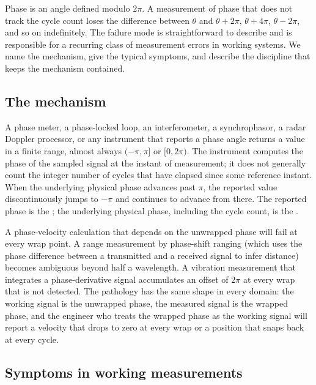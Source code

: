 Phase is an angle defined modulo $2\pi$. A measurement of phase
that does not track the cycle count loses the difference between
$\theta$ and $\theta + 2\pi$, $\theta + 4\pi$, $\theta - 2\pi$,
and so on indefinitely. The failure mode is straightforward to
describe and is responsible for a recurring class of measurement
errors in working systems. We name the mechanism, give the
typical symptoms, and describe the discipline that keeps the
mechanism contained.

\subsection{The mechanism}

A phase meter, a phase-locked loop, an interferometer, a
synchrophasor, a radar Doppler processor, or any instrument that
reports a phase angle returns a value in a finite range, almost
always $(-\pi, \pi]$ or $[0, 2\pi)$. The instrument computes the
phase of the sampled signal at the instant of measurement; it
does not generally count the integer number of cycles that have
elapsed since some reference instant. When the underlying
physical phase advances past $\pi$, the reported value
discontinuously jumps to $-\pi$ and continues to advance from
there. The reported phase is the ; the
underlying physical phase, including the cycle count, is the
.



A phase-velocity calculation that depends on the unwrapped phase
will fail at every wrap point. A range measurement by phase-shift
ranging (which uses the phase difference between a transmitted
and a received signal to infer distance) becomes ambiguous beyond
half a wavelength. A vibration measurement that integrates a
phase-derivative signal accumulates an offset of $2\pi$ at every
wrap that is not detected. The pathology has the same shape in
every domain: the working signal is the unwrapped phase, the
measured signal is the wrapped phase, and the engineer who treats
the wrapped phase as the working signal will report a velocity
that drops to zero at every wrap or a position that snaps back at
every cycle.

\subsection{Symptoms in working measurements}

